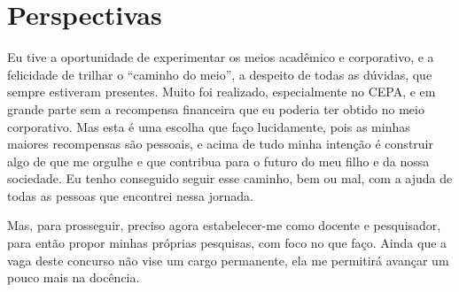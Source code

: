 \section{Perspectivas}

Eu tive a oportunidade de experimentar os meios acadêmico e corporativo, e a felicidade de trilhar o ``caminho do meio'', a despeito de todas as dúvidas, que sempre estiveram presentes. Muito foi realizado, especialmente no CEPA, e em grande parte sem a recompensa financeira que eu poderia ter obtido no meio corporativo. Mas esta é uma escolha que faço lucidamente, pois as minhas maiores recompensas são pessoais, e acima de tudo minha intenção é construir algo de que me orgulhe e que contribua para o futuro do meu filho e da nossa sociedade. Eu tenho conseguido seguir esse caminho, bem ou mal, com a ajuda de todas as pessoas que encontrei nessa jornada.

Mas, para prosseguir, preciso agora estabelecer-me como docente e pesquisador, para então propor minhas próprias pesquisas, com foco no que faço. Ainda que a vaga deste concurso não vise um cargo permanente, ela me permitirá avançar um pouco mais na docência.

